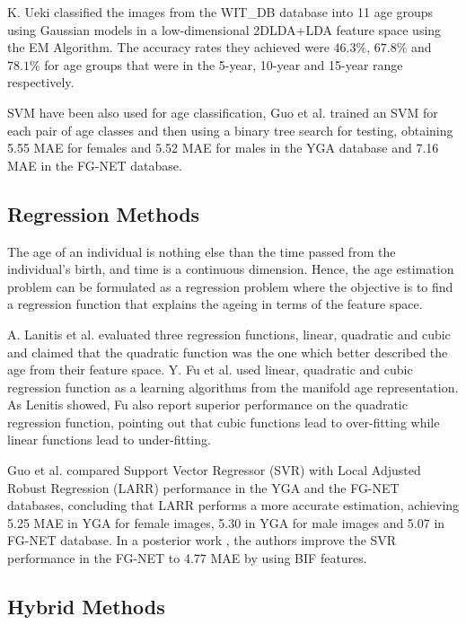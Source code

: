 K. Ueki \cite{Ueki:2006:SAC:1126250.1126269} classified the images from the WIT\_DB database into 11 age groups using Gaussian models in a low-dimensional 2DLDA+LDA feature space using the EM Algorithm. The accuracy rates they achieved were $46.3\%$, $67.8\%$ and $78.1\%$ for age groups that were in the 5-year, 10-year and 15-year range respectively.

SVM have been also used for age classification, Guo et al. \cite{4544009} \cite{Guo:2008:IHA:2319085.2321608} trained an SVM for each pair of age classes and then using a binary tree search for testing, obtaining 5.55 MAE for females and 5.52 MAE for males in the YGA database and 7.16 MAE in the FG-NET database. 


\subsection{Regression Methods}

The age of an individual is nothing else than the time passed from the individual's birth, and time is a continuous dimension. Hence, the age estimation problem can be formulated as a regression problem where the objective is to find a regression function that explains the ageing in terms of the feature space.

A. Lanitis et al. \cite{Lanitis:2004:CDC:2225304.2226166} evaluated three regression functions, linear, quadratic and cubic and claimed that the quadratic function was the one which better described the age from their feature space. Y. Fu et al. \cite{4523958} \cite{4284917} used linear, quadratic and cubic regression function as a learning algorithms from the manifold age representation. As Lenitis showed, Fu also report superior performance on the quadratic regression function, pointing out that cubic functions lead to over-fitting while linear functions lead to under-fitting.

Guo et al. \cite{4544009} \cite{Guo:2008:IHA:2319085.2321608} compared Support Vector Regressor (SVR) with Local Adjusted Robust Regression (LARR) performance in the YGA and the FG-NET databases, concluding that LARR performs a more accurate estimation, achieving 5.25 MAE in YGA for female images, 5.30 in YGA for male images and  5.07 in FG-NET database. In a posterior work \cite{conf/cvpr/GuoMFH09}, the authors improve the SVR performance in the FG-NET to 4.77 MAE by using BIF features.

\subsection{Hybrid Methods}

